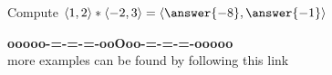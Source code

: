 \documentclass{ximera}
\begin{document}
\begin{question} 


Compute  $\langle 1, 2 \rangle  * \langle -2, 3 \rangle = \left\langle \answer{-8}, \answer{-1} \right\rangle $



\end{question}











\begin{center}
\textbf{\textcolor{green!50!black}{ooooo-=-=-=-ooOoo-=-=-=-ooooo}} \\

more examples can be found by following this link\\ 

\end{center}
\end{document}
